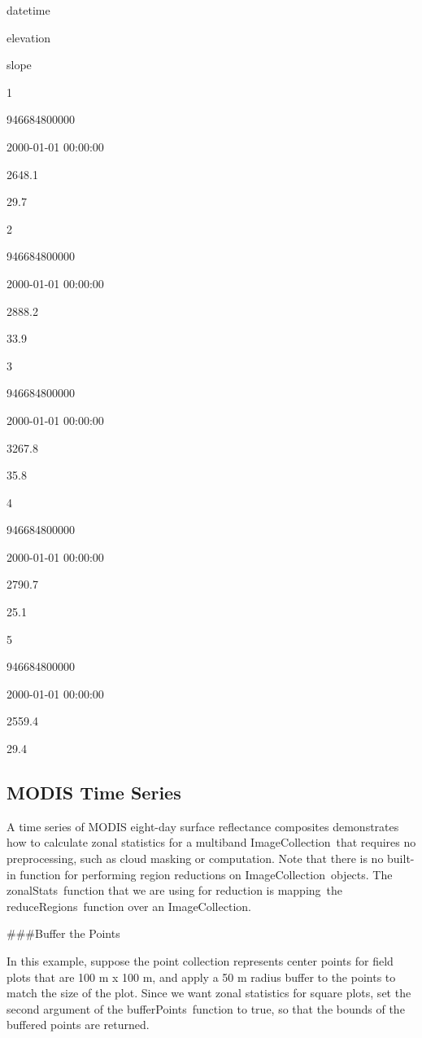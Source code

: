 \documentclass[
  letterpaper,
  DIV=11,
  numbers=noendperiod]{scrreprt}
\begin{document}
datetime

elevation

slope

1

946684800000

2000-01-01 00:00:00

2648.1

29.7

2

946684800000

2000-01-01 00:00:00

2888.2

33.9

3

946684800000

2000-01-01 00:00:00

3267.8

35.8

4

946684800000

2000-01-01 00:00:00

2790.7

25.1

5

946684800000

2000-01-01 00:00:00

2559.4

29.4

\hypertarget{modis-time-series}{%
\subsection{MODIS Time Series}\label{modis-time-series}}

A time series of MODIS eight-day surface reflectance composites
demonstrates how to calculate zonal statistics for a multiband
ImageCollection~that requires no preprocessing, such as cloud masking or
computation. Note that there is no built-in function for performing
region reductions on ImageCollection~objects. The zonalStats~function
that we are using for reduction is mapping~the reduceRegions~function
over an ImageCollection.

\#\#\#Buffer the Points

In this example, suppose the point collection represents center points
for field plots that are 100 m x 100 m, and apply a 50 m radius buffer
to the points to match the size of the plot. Since we want zonal
statistics for square plots, set the second argument of the
bufferPoints~function to true, so that the bounds of the buffered points
are returned.
\end{document}
